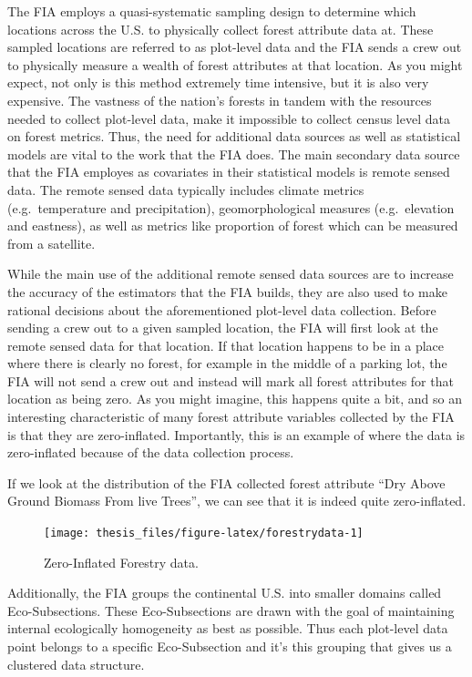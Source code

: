 \documentclass[12pt,twoside]{reedthesis}
\begin{document}
The FIA employs a quasi-systematic sampling design to determine which locations across the U.S. to physically collect forest attribute data at. These sampled locations are referred to as plot-level data and the FIA sends a crew out to physically measure a wealth of forest attributes at that location. As you might expect, not only is this method extremely time intensive, but it is also very expensive. The vastness of the nation's forests in tandem with the resources needed to collect plot-level data, make it impossible to collect census level data on forest metrics. Thus, the need for additional data sources as well as statistical models are vital to the work that the FIA does. The main secondary data source that the FIA employes as covariates in their statistical models is remote sensed data. The remote sensed data typically includes climate metrics (e.g.~temperature and precipitation), geomorphological measures (e.g.~elevation and eastness), as well as metrics like proportion of forest which can be measured from a satellite.

While the main use of the additional remote sensed data sources are to increase the accuracy of the estimators that the FIA builds, they are also used to make rational decisions about the aforementioned plot-level data collection. Before sending a crew out to a given sampled location, the FIA will first look at the remote sensed data for that location. If that location happens to be in a place where there is clearly no forest, for example in the middle of a parking lot, the FIA will not send a crew out and instead will mark all forest attributes for that location as being zero. As you might imagine, this happens quite a bit, and so an interesting characteristic of many forest attribute variables collected by the FIA is that they are zero-inflated. Importantly, this is an example of where the data is zero-inflated because of the data collection process.

If we look at the distribution of the FIA collected forest attribute ``Dry Above Ground Biomass From live Trees'', we can see that it is indeed quite zero-inflated.
\begin{figure}

{\centering \texttt{[image: thesis\_files/figure-latex/forestrydata-1]} 

}

\caption{Zero-Inflated Forestry data.}\label{fig:forestrydata}
\end{figure}
Additionally, the FIA groups the continental U.S. into smaller domains called Eco-Subsections. These Eco-Subsections are drawn with the goal of maintaining internal ecologically homogeneity as best as possible. Thus each plot-level data point belongs to a specific Eco-Subsection and it's this grouping that gives us a clustered data structure.
\end{document}
